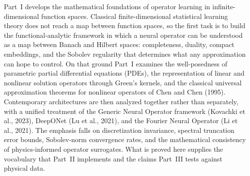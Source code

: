 \noindent Part~I develops the mathematical foundations of operator learning in
infinite-dimensional function spaces. Classical finite-dimensional statistical
learning theory does not reach a map between function spaces, so the first task
is to build the functional-analytic framework in which a neural operator can be
understood as a map between Banach and Hilbert spaces: completeness, duality,
compact embeddings, and the Sobolev regularity that determines what any
approximation can hope to control. On that ground Part~I examines the
well-posedness of parametric partial differential equations (PDEs), the
representation of linear and nonlinear solution operators through Green's
kernels, and the classical universal approximation theorems for nonlinear
operators of Chen and Chen (1995). Contemporary architectures are then analyzed
together rather than separately, with a unified treatment of the Generic Neural
Operator framework (Kovachki et al., 2023), DeepONet (Lu et al., 2021), and the
Fourier Neural Operator (Li et al., 2021). The emphasis falls on discretization
invariance, spectral truncation error bounds, Sobolev-norm convergence rates,
and the mathematical consistency of physics-informed operator surrogates. What
is proved here supplies the vocabulary that Part~II implements and the claims
Part~III tests against physical data.
